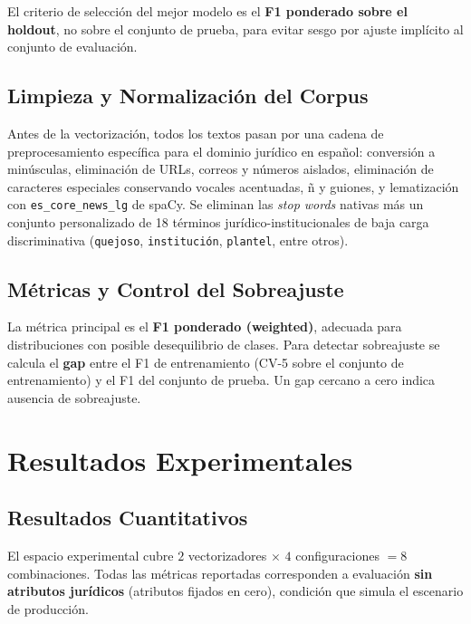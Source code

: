 El criterio de selección del mejor modelo es el \textbf{F1 ponderado
sobre el holdout}, no sobre el conjunto de prueba, para evitar sesgo
por ajuste implícito al conjunto de evaluación.

\subsection{Limpieza y Normalización del Corpus}
\label{subsec:limpieza}

Antes de la vectorización, todos los textos pasan por una cadena de
preprocesamiento específica para el dominio jurídico en español: conversión
a minúsculas, eliminación de URLs, correos y números aislados, eliminación
de caracteres especiales conservando vocales acentuadas, ñ y guiones,
y lematización con \texttt{es\_core\_news\_lg} de spaCy. Se eliminan las
\textit{stop words} nativas más un conjunto personalizado de 18 términos
jurídico-institucionales de baja carga discriminativa
(\texttt{quejoso}, \texttt{institución}, \texttt{plantel}, entre otros).

\subsection{Métricas y Control del Sobreajuste}
\label{subsec:metricas_protocolo}

La métrica principal es el \textbf{F1 ponderado (weighted)}, adecuada para
distribuciones con posible desequilibrio de clases. Para detectar
sobreajuste se calcula el \textbf{gap} entre el F1 de entrenamiento
(CV-5 sobre el conjunto de entrenamiento) y el F1 del conjunto de prueba.
Un gap cercano a cero indica ausencia de sobreajuste.

\section{Resultados Experimentales}
\label{sec:resultados}

\subsection{Resultados Cuantitativos}
\label{subsec:resultados_cuantitativos}

El espacio experimental cubre $2$ vectorizadores $\times$ $4$
configuraciones $= 8$ combinaciones. Todas las métricas reportadas
corresponden a evaluación \textbf{sin atributos jurídicos} (atributos
fijados en cero), condición que simula el escenario de producción.

